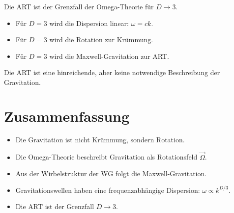 Die ART ist der Grenzfall der Omega-Theorie für \( D \to 3 \).

\begin{itemize}
\item Für \( D = 3 \) wird die Dispersion linear: \( \omega = ck \).
\item Für \( D = 3 \) wird die Rotation zur Krümmung.
\item Für \( D = 3 \) wird die Maxwell-Gravitation zur ART.
\end{itemize}

Die ART ist eine hinreichende, aber keine notwendige Beschreibung der Gravitation.

\section{Zusammenfassung}

\begin{itemize}
\item Die Gravitation ist nicht Krümmung, sondern Rotation.
\item Die Omega-Theorie beschreibt Gravitation als Rotationsfeld \( \vec{\Omega} \).
\item Aus der Wirbelstruktur der WG folgt die Maxwell-Gravitation.
\item Gravitationswellen haben eine frequenzabhängige Dispersion: \( \omega \propto k^{D/3} \).
\item Die ART ist der Grenzfall \( D \to 3 \).
\end{itemize}